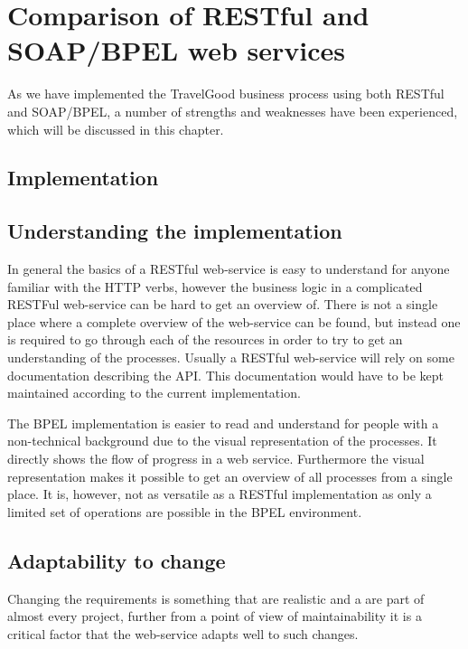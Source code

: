 {\setlength{\chapterfontsize}{26pt}
\chapter{Comparison of RESTful and SOAP/BPEL web services}
}

As we have implemented the TravelGood business process using both RESTful and SOAP/BPEL, a number of strengths and weaknesses have been experienced, which will be discussed in this chapter.

\section{Implementation}

\section{Understanding the implementation}
In general the basics of a RESTful web-service is easy to understand for anyone familiar with the HTTP verbs, however the business logic in a complicated RESTFul web-service can be hard to get an overview of. There is not a single place where a complete overview of the web-service can be found, but instead one is required to go through each of the resources in order to try to get an understanding of the processes. Usually a RESTful web-service will rely on some documentation describing the API. This documentation would have to be kept maintained according to the current implementation. 

The BPEL implementation is easier to read and understand for people with a non-technical background due to the visual representation of the processes. It directly shows the flow of progress in a web service. Furthermore the visual representation makes it possible to get an overview of all processes from a single place. It is, however, not as versatile as a RESTful implementation as only a limited set of operations are possible in the BPEL environment.

\section{Adaptability to change}
Changing the requirements is something that are realistic and a are part of almost every project, further from a point of view of maintainability it is a critical factor that the web-service adapts well to such changes.

